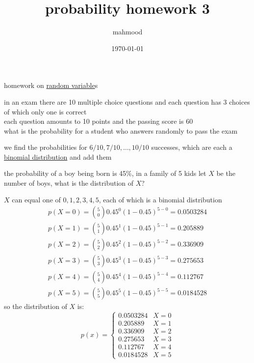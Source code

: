 \documentclass[a4paper,12pt]{article}
\author{mahmood}
\date{\today}
\title{probability homework 3}
\begin{document}
\maketitle
homework on \href{20230104221353-random_variable.org}{random variable}s\\
\begin{question}
in an exam there are 10 multiple choice questions and each question has 3 choices of which only one is correct\\
each question amounts to 10 points and the passing score is 60\\
what is the probability for a student who answers randomly to pass the exam\\
\begin{answer}
we find the probabilities for \(6/10,7/10,\dots,10/10\) successes, which are each a \href{20230113174354-binomial_distribution.org}{binomial distribution} and add them\\
\end{answer}
\end{question}
\begin{question}
the probability of a boy being born is 45\%, in a family of 5 kids let \(X\) be the number of boys, what is the distribution of \(X\)?\\
\begin{answer}
\(X\) can equal one of \(0,1,2,3,4,5\), each of which is a binomial distribution\\
\begin{gather*}
p(X=0)=\binom{5}{0}0.45^0{(1-0.45)}^{5-0}=0.0503284\\
p(X=1)=\binom{5}{1}0.45^1{(1-0.45)}^{5-1}=0.205889\\
p(X=2)=\binom{5}{2}0.45^2{(1-0.45)}^{5-2}=0.336909\\
p(X=3)=\binom{5}{3}0.45^3{(1-0.45)}^{5-3}=0.275653\\
p(X=4)=\binom{5}{4}0.45^4{(1-0.45)}^{5-4}=0.112767\\
p(X=5)=\binom{5}{5}0.45^5{(1-0.45)}^{5-5}=0.0184528
\end{gather*}
so the distribution of \(X\) is:\\
\[
p(x) = \begin{cases}
         0.0503284 & X=0\\
         0.205889 & X=1\\
         0.336909 & X=2\\
         0.275653 & X=3\\
         0.112767 & X=4\\
         0.0184528 & X=5
       \end{cases}
\]\\
\end{answer}
\end{question}
\end{document}
